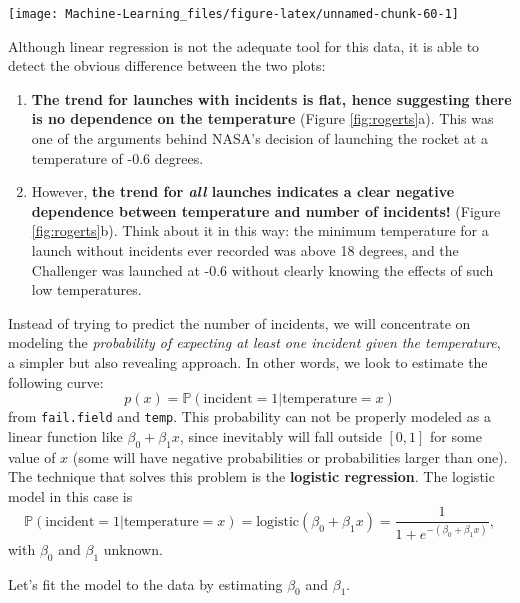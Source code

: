 \documentclass[]{book}
\providecommand{\tightlist}{%
  \setlength{\itemsep}{0pt}\setlength{\parskip}{0pt}}
\theoremstyle{definition}
\theoremstyle{definition}
\theoremstyle{definition}
\theoremstyle{remark}
\begin{document}
\begin{center}\texttt{[image: Machine-Learning\_files/figure-latex/unnamed-chunk-60-1]} \end{center}

Although linear regression is not the adequate tool for this data, it is
able to detect the obvious difference between the two plots:

\begin{enumerate}
\def\labelenumi{\arabic{enumi}.}
\tightlist
\item
  \textbf{The trend for launches with incidents is flat, hence
  suggesting there is no dependence on the temperature} (Figure
  \ref{fig:rogerts}a). This was one of the arguments behind NASA's
  decision of launching the rocket at a temperature of -0.6 degrees.
\item
  However, \textbf{the trend for \emph{all} launches indicates a clear
  negative dependence between temperature and number of incidents!}
  (Figure \ref{fig:rogerts}b). Think about it in this way: the minimum
  temperature for a launch without incidents ever recorded was above 18
  degrees, and the Challenger was launched at -0.6 without clearly
  knowing the effects of such low temperatures.
\end{enumerate}

Instead of trying to predict the number of incidents, we will
concentrate on modeling the \emph{probability of expecting at least one
incident given the temperature}, a simpler but also revealing approach.
In other words, we look to estimate the following curve: \[
p(x)=\mathbb{P}(\text{incident}=1|\text{temperature}=x)
\] from \texttt{fail.field} and \texttt{temp}. This probability can not
be properly modeled as a linear function like \(\beta_0+\beta_1x\),
since inevitably will fall outside \([0,1]\) for some value of \(x\)
(some will have negative probabilities or probabilities larger than
one). The technique that solves this problem is the \textbf{logistic
regression}. The logistic model in this case is \[
\mathbb{P}(\text{incident}=1|\text{temperature}=x)=\text{logistic}\left(\beta_0+\beta_1x\right)=\frac{1}{1+e^{-(\beta_0+\beta_1x)}},
\] with \(\beta_0\) and \(\beta_1\) unknown.

Let's fit the model to the data by estimating \(\beta_0\) and
\(\beta_1\).
\end{document}

